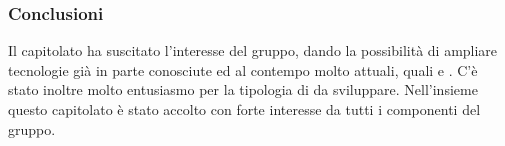 	\subsubsection{Conclusioni}
	Il capitolato ha suscitato l'interesse del gruppo, dando la possibilità di ampliare tecnologie già in parte conosciute ed al contempo molto attuali, quali  e . C'è stato inoltre molto entusiasmo per la tipologia di  da sviluppare. Nell'insieme questo capitolato è stato accolto con forte interesse da tutti i componenti del gruppo.
